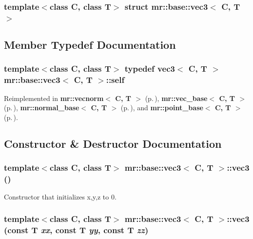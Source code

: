 \subsubsection*{template$<$class C, class T$>$ struct mr::base::vec3$<$ C, T $>$}



\subsection{Member Typedef Documentation}
\subsubsection{\setlength{\rightskip}{0pt plus 5cm}template$<$class C, class T$>$ typedef {\bf vec3}$<$ C, T $>$ {\bf mr::base::vec3}$<$ C, T $>$::{\bf self}}\label{structmr_1_1base_1_1vec3_w0}




Reimplemented in {\bf mr::vecnorm$<$ C, T $>$} {\rm (p.\,\pageref{structmr_1_1vecnorm_w0})}, {\bf mr::vec\_\-base$<$ C, T $>$} {\rm (p.\,\pageref{structmr_1_1vec__base_w0})}, {\bf mr::normal\_\-base$<$ C, T $>$} {\rm (p.\,\pageref{structmr_1_1normal__base_w0})}, and {\bf mr::point\_\-base$<$ C, T $>$} {\rm (p.\,\pageref{structmr_1_1point__base_w0})}.

\subsection{Constructor \& Destructor Documentation}
\subsubsection{\setlength{\rightskip}{0pt plus 5cm}template$<$class C, class T$>$ {\bf mr::base::vec3}$<$ C, T $>$::{\bf vec3} ()\hspace{0.3cm}{\tt  [inline]}}\label{structmr_1_1base_1_1vec3_a3}


Constructor that initializes x,y,z to 0. 

\subsubsection{\setlength{\rightskip}{0pt plus 5cm}template$<$class C, class T$>$ {\bf mr::base::vec3}$<$ C, T $>$::{\bf vec3} (const T {\em xx}, const T {\em yy}, const T {\em zz})\hspace{0.3cm}{\tt  [inline]}}\label{structmr_1_1base_1_1vec3_a4}


